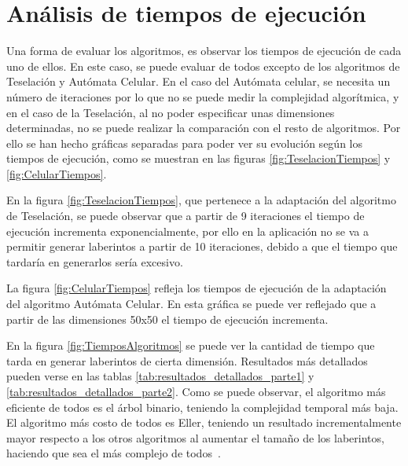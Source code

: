 \section{Análisis de tiempos de ejecución}
Una forma de evaluar los algoritmos, es observar los tiempos de ejecución de cada uno de ellos. En este caso, se puede evaluar de todos excepto de los algoritmos de Teselación y Autómata Celular. 
En el caso del Autómata celular, se necesita un número de iteraciones por lo que no se puede medir la complejidad algorítmica, y en el caso de la Teselación, al no poder especificar unas dimensiones determinadas, no se puede realizar la comparación con el resto de algoritmos. Por ello se han hecho gráficas separadas para poder ver su evolución según los tiempos de ejecución, como se muestran en las figuras \ref{fig:TeselacionTiempos} y \ref{fig:CelularTiempos}.

En la figura \ref{fig:TeselacionTiempos}, que pertenece a la adaptación del algoritmo de Teselación, se puede observar que a partir de 9 iteraciones el tiempo de ejecución incrementa exponencialmente, por ello en la aplicación no se va a permitir generar laberintos a partir de 10 iteraciones, debido a que el tiempo que tardaría en generarlos sería excesivo.

La figura \ref{fig:CelularTiempos} refleja los tiempos de ejecución de la adaptación del algoritmo Autómata Celular. En esta gráfica se puede ver reflejado que a partir de las dimensiones 50x50 el tiempo de ejecución incrementa.

En la figura \ref{fig:TiemposAlgoritmos} se puede ver la cantidad de tiempo que tarda en generar laberintos de cierta dimensión. Resultados más detallados pueden verse en las tablas \ref{tab:resultados_detallados_parte1} y \ref{tab:resultados_detallados_parte2}.
Como se puede observar, el algoritmo más eficiente de todos es el árbol binario, teniendo la complejidad temporal más baja. El algoritmo más costo de todos es Eller, teniendo un resultado incrementalmente mayor respecto a los otros algoritmos al aumentar el tamaño de los laberintos, haciendo que sea el más complejo de todos~\cite{MazeGenAnalysis}.

\vspace{3cm}

